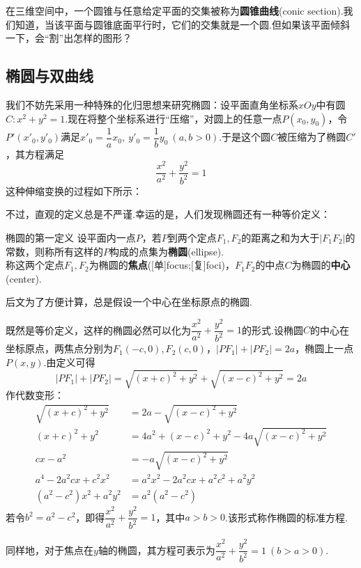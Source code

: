 \documentclass[lang=cn, zihao=4.5]{elegantbook}
\begin{document}
在三维空间中，一个圆锥与任意给定平面的交集被称为\textbf{圆锥曲线}(conic section).我们知道，当该平面与圆锥底面平行时，它们的交集就是一个圆.但如果该平面倾斜一下，会“割”出怎样的图形？

\subsection{椭圆与双曲线}

我们不妨先采用一种特殊的化归思想来研究椭圆：设平面直角坐标系$xOy$中有圆$C:x^2+y^2=1$.现在将整个坐标系进行“压缩”，对圆上的任意一点$P(x_0,y_0)$，令$P'(x'_0,y'_0)$满足$x'_0=\dfrac{1}{a} x_0,~y'_0=\dfrac{1}{b} y_0~(a,b>0)$.于是这个圆$C$被压缩为了椭圆$C'$，其方程满足$$\frac{x^2}{a^2}+\frac{y^2}{b^2}=1$$
这种伸缩变换的过程如下所示：


不过，直观的定义总是不严谨.幸运的是，人们发现椭圆还有一种等价定义：

\begin{definition}{椭圆的第一定义}
	设平面内一点$P$，若$P$到两个定点$F_1,F_2$的距离之和为大于$|F_1F_2|$的常数，则称所有这样的$P$构成的点集为\textbf{椭圆}(ellipse). \\
	称这两个定点$F_1,F_2$为椭圆的\textbf{焦点}([单]focus;[复]foci)，$F_1F_2$的中点$C$为椭圆的\textbf{中心}(center).
\end{definition}
\begin{remark}
	后文为了方便计算，总是假设一个中心在坐标原点的椭圆.
\end{remark}

既然是等价定义，这样的椭圆必然可以化为$\dfrac{x^2}{a^2}+\dfrac{y^2}{b^2}=1$的形式.设椭圆$C$的中心在坐标原点，两焦点分别为$F_1(-c,0),F_2(c,0)$，$|PF_1|+|PF_2|=2a$，椭圆上一点$P(x,y)$.由定义可得$$|PF_1|+|PF_2|=\sqrt{(x+c)^2+y^2} + \sqrt{(x-c)^2+y^2} = 2a$$
作代数变形：
\begin{align*}
	\sqrt{(x+c)^2+y^2} &= 2a - \sqrt{(x-c)^2+y^2} \\
	(x+c)^2+y^2 &= 4a^2 + (x-c)^2+y^2 - 4a\sqrt{(x-c)^2+y^2} \\
	cx-a^2 &= -a\sqrt{(x-c)^2+y^2} \\
	a^4 - 2a^2cx + c^2x^2 &= a^2x^2 - 2a^2cx + a^2c^2 + a^2y^2 \\
	(a^2-c^2)x^2+a^2y^2 &= a^2(a^2-c^2)
\end{align*}
若令$b^2=a^2-c^2$，即得$\dfrac{x^2}{a^2}+\dfrac{y^2}{b^2}=1$，其中$a>b>0$.该形式称作椭圆的标准方程.

同样地，对于焦点在$y$轴的椭圆，其方程可表示为$\dfrac{x^2}{a^2}+\dfrac{y^2}{b^2}=1~(b>a>0)$.
\end{document}
